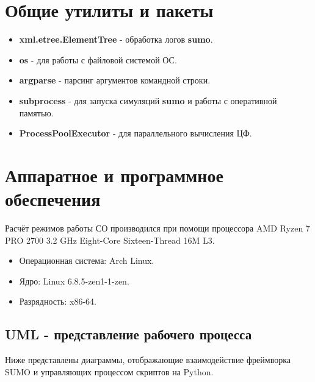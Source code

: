 \section{Общие утилиты и пакеты}	
\begin{itemize}
	\item \textbf{xml.etree.ElementTree} - обработка логов \textbf{sumo}.
	\item  \textbf{os} - для работы с файловой системой ОС.
	\item \textbf{argparse} - парсинг аргументов командной строки.
	\item \textbf{subprocess} - для запуска симуляций \textbf{sumo} и работы с оперативной памятью.
	\item \textbf{ProcessPoolExecutor} - для параллельного вычисления ЦФ.
\end{itemize}
\section{Аппаратное и программное обеспечения}
Расчёт режимов работы СО производился при помощи процессора AMD Ryzen 7 PRO 2700 3.2 GHz Eight-Core Sixteen-Thread 16M L3.\\
\begin{itemize}
	\item Операционная система: Arch Linux.                   
	\item Ядро: Linux 6.8.5-zen1-1-zen.
	\item Разрядность: x86-64.
\end{itemize}

\subsection{UML - представление рабочего процесса}
Ниже представлены диаграммы, отображающие взаимодействие фреймворка SUMO и управляющих процессом скриптов на Python.


\clearpage
\newpage

%
